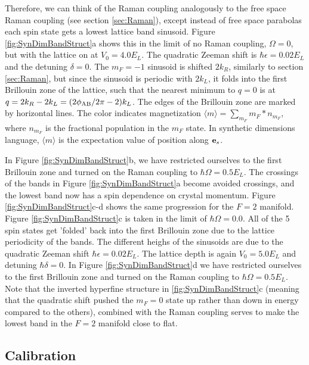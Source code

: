 Therefore, we can think of the Raman coupling analogously to the free space Raman coupling (see section \ref{sec:Raman}), except instead of free space parabolas each spin state gets a lowest lattice band sinusoid.   Figure \ref{fig:SynDimBandStruct}a shows this in the limit of no Raman coupling, $\Omega=0$, but with the lattice on at $V_0=4.0 E_L$. The quadratic Zeeman shift is $\hbar\epsilon=0.02 E_L$ and the detuning $\delta=0$. The $m_F=-1$ sinusoid is shifted $2k_R$, similarly to section \ref{sec:Raman}, but since the sinusoid is periodic with $2k_L$, it folds into the first Brillouin zone of the lattice, such that the nearest minimum to $q=0$ is at $q = 2k_R-2k_L = (2\phi_{\rm AB}/2\pi - 2)k_L$. The edges of the Brillouin zone are marked by horizontal lines. The color indicates magnetization $\langle m\rangle=\sum_{m_F}m_F*n_{m_F}$, where $n_{m_F}$ is the fractional population in the $m_F$ state. In synthetic dimensions language, $\langle m \rangle$ is the expectation value of position along ${\bf e}_s$.

In Figure \ref{fig:SynDimBandStruct}b, we have restricted ourselves to the first Brillouin zone and turned on the Raman coupling to $\hbar\Omega = 0.5 E_L$. The crossings of the bands in Figure \ref{fig:SynDimBandStruct}a become avoided crossings, and the lowest band now has a spin dependence on crystal momentum. Figure \ref{fig:SynDimBandStruct}c-d shows the same progression for the $F=2$ manifold. Figure \ref{fig:SynDimBandStruct}c is taken in the limit of $\hbar\Omega=0.0$. All of the 5 spin states get 'folded' back into the first Brillouin zone due to the lattice periodicity of the bands. The different heighs of the sinusoids are due to the quadratic Zeeman shift $\hbar\epsilon=0.02 E_L$. The lattice depth is again $V_0=5.0 E_L$ and detuning $\hbar\delta=0$. In Figure \ref{fig:SynDimBandStruct}d we have restricted ourselves to the first Brillouin zone and turned on the Raman coupling to $\hbar\Omega=0.5 E_L$.  Note that the inverted hyperfine structure in \ref{fig:SynDimBandStruct}c (meaning that the quadratic shift pushed the $m_F=0$ state up rather than down in energy compared to the others), combined with the Raman coupling serves to make the lowest band in the $F=2$ manifold close to flat. 


\subsection{Calibration}\label{sec:SynDimCalibration}

